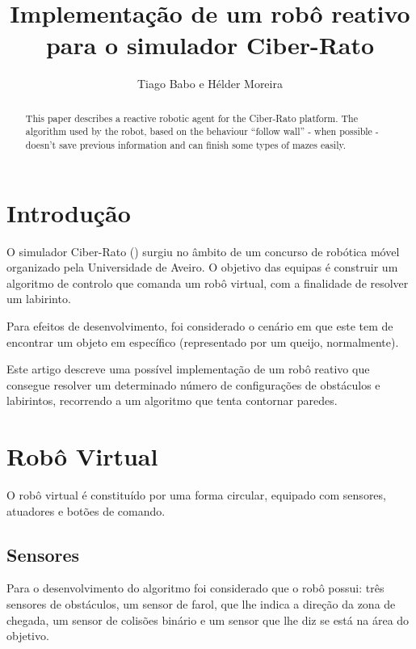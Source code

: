 \documentclass[citeauthoryear]{llncs} %
\begin{document}
\title{Implementação de um robô reativo para o simulador Ciber-Rato}
\author{Tiago Babo e Hélder Moreira}


\maketitle

\begin{abstract}
This paper describes a reactive robotic agent for the Ciber-Rato platform. The algorithm used by the robot, based on the behaviour “follow wall” - when possible - doesn't save previous information and can finish some types of mazes easily.
\end{abstract}

\section{Introdução}
O simulador Ciber-Rato (\cite{microrato}) surgiu no âmbito de um concurso de robótica móvel organizado pela Universidade de Aveiro. O objetivo das equipas é construir um algoritmo de controlo que comanda um robô virtual, com a finalidade de resolver um labirinto. 

Para efeitos de desenvolvimento, foi considerado o cenário em que este tem de encontrar um objeto em específico (representado por um queijo, normalmente).

Este artigo descreve uma possível implementação de um robô reativo que consegue resolver um determinado número de configurações de obstáculos e labirintos, recorrendo a um algoritmo que tenta contornar paredes. 

\section{Robô Virtual}

O robô virtual é constituído por uma forma circular, equipado com sensores, atuadores e botões de comando. 

\subsection{Sensores}
Para o desenvolvimento do algoritmo foi considerado que o robô possui: três sensores de obstáculos, um sensor de farol, que lhe indica a direção da zona de chegada, um sensor de colisões binário e um sensor que lhe diz se está na área do objetivo. 
\end{document}
